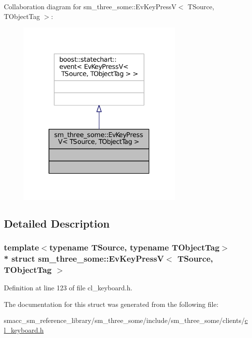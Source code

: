 Collaboration diagram for sm\+\_\+three\+\_\+some\+:\+:Ev\+Key\+PressV$<$ T\+Source, T\+Object\+Tag $>$\+:
\nopagebreak
\begin{figure}[H]
\begin{center}
\leavevmode
\includegraphics[width=235pt]{structsm__three__some_1_1EvKeyPressV__coll__graph}
\end{center}
\end{figure}


\subsection{Detailed Description}
\subsubsection*{template$<$typename T\+Source, typename T\+Object\+Tag$>$\\*
struct sm\+\_\+three\+\_\+some\+::\+Ev\+Key\+Press\+V$<$ T\+Source, T\+Object\+Tag $>$}



Definition at line 123 of file cl\+\_\+keyboard.\+h.



The documentation for this struct was generated from the following file\+:\begin{DoxyCompactItemize}
\item 
smacc\+\_\+sm\+\_\+reference\+\_\+library/sm\+\_\+three\+\_\+some/include/sm\+\_\+three\+\_\+some/clients/\hyperlink{cl__keyboard_8h}{cl\+\_\+keyboard.\+h}\end{DoxyCompactItemize}
